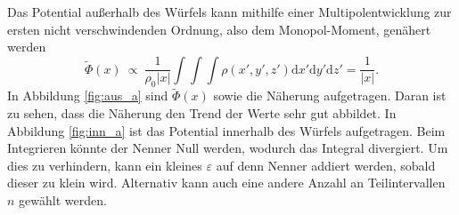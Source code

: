 Das Potential außerhalb des Würfels kann mithilfe einer Multipolentwicklung zur ersten nicht verschwindenden Ordnung, also dem Monopol-Moment, genähert werden
\begin{equation*}
  \tilde{\Phi}(x) \: \propto \: \frac{1}{\rho_0 |x|} \int \int \int \rho(x', y', z') \mathrm{d}x'\mathrm{d}y'\mathrm{d}z' = \frac{1}{|x|}.
\end{equation*}
In Abbildung \ref{fig:aus_a} sind \(\tilde{\Phi}(x)\) sowie die Näherung aufgetragen. Daran ist zu sehen, dass die Näherung den Trend der Werte sehr gut abbildet.
In Abbildung \ref{fig:inn_a} ist das Potential innerhalb des Würfels aufgetragen.
Beim Integrieren könnte der Nenner Null werden, wodurch das Integral divergiert. Um dies zu verhindern, kann ein kleines \(\varepsilon\) auf denn Nenner addiert werden, sobald dieser zu klein wird. Alternativ kann auch eine andere Anzahl an Teilintervallen \(n\) gewählt werden.
